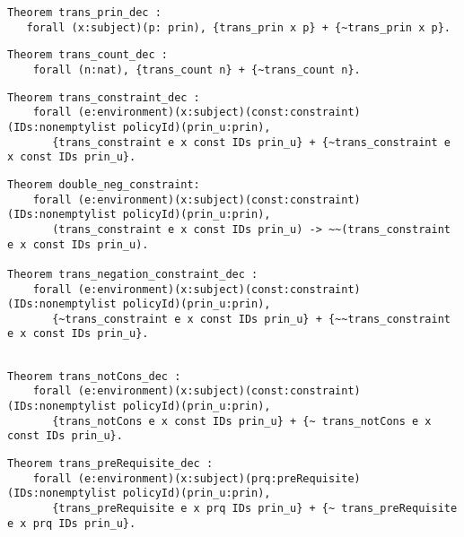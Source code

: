 \begin{lstlisting}
Theorem trans_prin_dec :
   forall (x:subject)(p: prin), {trans_prin x p} + {~trans_prin x p}.
\end{lstlisting}

\begin{lstlisting}
Theorem trans_count_dec :
    forall (n:nat), {trans_count n} + {~trans_count n}.
\end{lstlisting}

\begin{lstlisting}
Theorem trans_constraint_dec :
    forall (e:environment)(x:subject)(const:constraint)(IDs:nonemptylist policyId)(prin_u:prin),
       {trans_constraint e x const IDs prin_u} + {~trans_constraint e x const IDs prin_u}.
\end{lstlisting}

\begin{lstlisting}
Theorem double_neg_constraint:
    forall (e:environment)(x:subject)(const:constraint)(IDs:nonemptylist policyId)(prin_u:prin),
       (trans_constraint e x const IDs prin_u) -> ~~(trans_constraint e x const IDs prin_u).
  
Theorem trans_negation_constraint_dec :
    forall (e:environment)(x:subject)(const:constraint)(IDs:nonemptylist policyId)(prin_u:prin),
       {~trans_constraint e x const IDs prin_u} + {~~trans_constraint e x const IDs prin_u}.
       
\end{lstlisting}

\begin{lstlisting}
Theorem trans_notCons_dec :
    forall (e:environment)(x:subject)(const:constraint)(IDs:nonemptylist policyId)(prin_u:prin),
       {trans_notCons e x const IDs prin_u} + {~ trans_notCons e x const IDs prin_u}.

\end{lstlisting}


\begin{lstlisting}
Theorem trans_preRequisite_dec :
    forall (e:environment)(x:subject)(prq:preRequisite)(IDs:nonemptylist policyId)(prin_u:prin),
       {trans_preRequisite e x prq IDs prin_u} + {~ trans_preRequisite e x prq IDs prin_u}.
\end{lstlisting}


